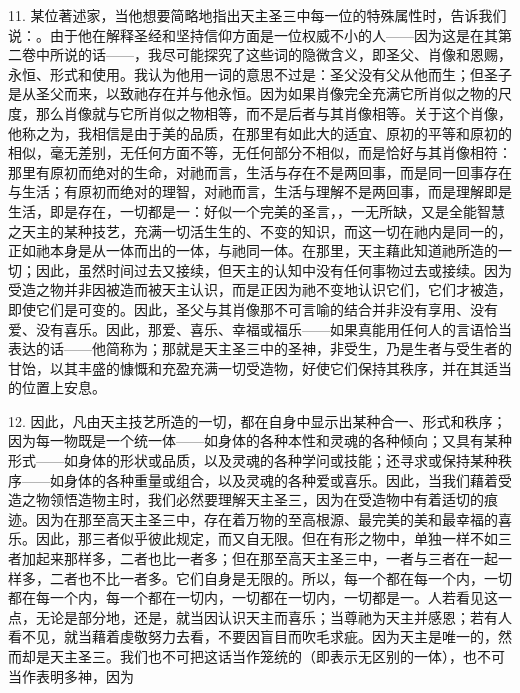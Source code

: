 11. 某位著述家，当他想要简略地指出天主圣三中每一位的特殊属性时，告诉我们说：。由于他在解释圣经和坚持信仰方面是一位权威不小的人——因为这是在其第二卷中所说的话——，我尽可能探究了这些词的隐微含义，即圣父、肖像和恩赐，永恒、形式和使用。我认为他用一词的意思不过是：圣父没有父从他而生；但圣子是从圣父而来，以致祂存在并与他永恒。因为如果肖像完全充满它所肖似之物的尺度，那么肖像就与它所肖似之物相等，而不是后者与其肖像相等。关于这个肖像，他称之为，我相信是由于美的品质，在那里有如此大的适宜、原初的平等和原初的相似，毫无差别，无任何方面不等，无任何部分不相似，而是恰好与其肖像相符：那里有原初而绝对的生命，对祂而言，生活与存在不是两回事，而是同一回事存在与生活；有原初而绝对的理智，对祂而言，生活与理解不是两回事，而是理解即是生活，即是存在，一切都是一：好似一个完美的圣言，，一无所缺，又是全能智慧之天主的某种技艺，充满一切活生生的、不变的知识，而这一切在祂内是同一的，正如祂本身是从一体而出的一体，与祂同一体。在那里，天主藉此知道祂所造的一切；因此，虽然时间过去又接续，但天主的认知中没有任何事物过去或接续。因为受造之物并非因被造而被天主认识，而是正因为祂不变地认识它们，它们才被造，即使它们是可变的。因此，圣父与其肖像那不可言喻的结合并非没有享用、没有爱、没有喜乐。因此，那爱、喜乐、幸福或福乐——如果真能用任何人的言语恰当表达的话——他简称为；那就是天主圣三中的圣神，非受生，乃是生者与受生者的甘饴，以其丰盛的慷慨和充盈充满一切受造物，好使它们保持其秩序，并在其适当的位置上安息。\par

12. 因此，凡由天主技艺所造的一切，都在自身中显示出某种合一、形式和秩序；因为每一物既是一个统一体——如身体的各种本性和灵魂的各种倾向；又具有某种形式——如身体的形状或品质，以及灵魂的各种学问或技能；还寻求或保持某种秩序——如身体的各种重量或组合，以及灵魂的各种爱或喜乐。因此，当我们藉着受造之物领悟造物主时，我们必然要理解天主圣三，因为在受造物中有着适切的痕迹。因为在那至高天主圣三中，存在着万物的至高根源、最完美的美和最幸福的喜乐。因此，那三者似乎彼此规定，而又自无限。但在有形之物中，单独一样不如三者加起来那样多，二者也比一者多；但在那至高天主圣三中，一者与三者在一起一样多，二者也不比一者多。它们自身是无限的。所以，每一个都在每一个内，一切都在每一个内，每一个都在一切内，一切都在一切内，一切都是一。人若看见这一点，无论是部分地，还是，就当因认识天主而喜乐；当尊祂为天主并感恩；若有人看不见，就当藉着虔敬努力去看，不要因盲目而吹毛求疵。因为天主是唯一的，然而却是天主圣三。我们也不可把这话当作笼统的（即表示无区别的一体），也不可当作表明多神，因为\par

